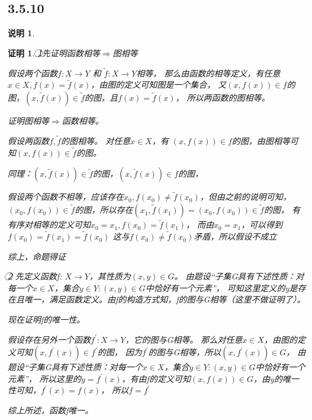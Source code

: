 \documentclass{article}
\theoremstyle{mystyle}
\newtheorem*{zremark}{说明}
\theoremstyle{zproofstyle}
\newtheorem*{zproof}{证明}
\begin{document}
\subsection*{3.5.10}
\begin{zgraytheorem}
  \begin{zremark}

  \end{zremark}
\end{zgraytheorem}
\begin{zproof}
  \textcircled{1}先证明函数相等$\Rightarrow$图相等

  假设两个函数$f: X \rightarrow Y$ 和 $\tilde{f}  : X \rightarrow Y$相等，
  那么由函数的相等定义，有任意$x \in X, f(x) = \tilde{f}(x)$，由图的定义可知图是一个集合，
  又$(x, f(x)) \in f$的图，$(x, \tilde{f}(x)) \in \tilde{f}$的图，且$f(x) = \tilde{f}(x)$，
  所以两函数的图相等。

  证明图相等$\Rightarrow$函数相等。

  假设两函数$f , \tilde{f}$的图相等。
  对任意$x \in X$，有 $(x, f(x)) \in f$的图，由图相等可知$(x, f(x)) \in \tilde{f}$的图。

  同理：$(x, \tilde{f}(x)) \in \tilde{f}$的图，$(x, \tilde{f}(x)) \in f$的图，

  假设两个函数不相等，应该存在$x_{0}, f(x_{0}) \neq \tilde{f}(x_{0})$，但由之前的说明可知，
  $(x_0, f(x_0)) \in \tilde{f}$的图，所以存在$(x_1, \tilde{f}(x_1))=(x_0,f(x_0)) \in \tilde{f}$的图，
  有有序对相等的定义可知$x_0=x_1, f(x_0) = \tilde{f}(x_1)$，
  而由$x_0=x_1$，可以得到$f(x_0) = \tilde{f}(x_1) = \tilde{f}(x_0)$
  这与$f(x_{0}) \neq \tilde{f}(x_{0})$矛盾，所以假设不成立

  综上，命题得证

  \textcircled{2}
  先定义函数f: $X \rightarrow Y$，其性质为$(x,y) \in G$。
  由题设“子集G具有下述性质：对每一个$x \in X$，集合{$y \in Y:(x,y) \in G$}中恰好有一个元素”，
  可知这里定义的y是存在且唯一，满足函数定义。由f的构造方式知，f的图与G相等（这里不做证明了）。

  现在证明f的唯一性。

  假设存在另外一个函数$f^\prime: X \rightarrow Y$，它的图与G相等。
  那么对任意$x \in X$，由图的定义可知$(x, f^\prime(x)) \in f^\prime$的图，
  因为$f^\prime$的图与G相等，所以$(x, f^\prime(x)) \in G$，
  由题设“子集G具有下述性质：对每一个$x \in X$，集合{$y \in Y:(x,y) \in G$}中恰好有一个元素”，
  所以这里的$y=f^\prime(x)$，有由f的定义可知$(x,f(x)) \in G$，由y的唯一性可知，$f^\prime(x)=f(x)$，
  所以$f=f^\prime$

  综上所述，函数f唯一。
\end{zproof}
\end{document}
